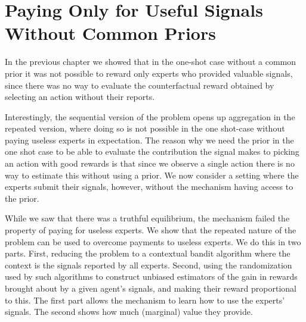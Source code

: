 




\section{Paying Only for Useful Signals Without Common Priors}

In the previous chapter we showed that in the one-shot case without a common prior it was not possible to reward only experts who provided valuable signals, since there was no way to evaluate the counterfactual reward obtained by selecting an action without their reports. 

Interestingly, the sequential version of the problem opens up aggregation in the repeated version, where doing so is not possible in the one shot-case without paying useless experts in expectation.
The reason why we need the prior in the one shot case to be able to evaluate the contribution the signal makes to picking an action with good rewards is that since we observe a single action there is no way to estimate this without using a prior. 
We now consider a setting where the experts submit their signals, however, without the mechanism having access to the prior.

While we saw that there was a truthful equilibrium, the mechanism failed the property of paying for useless experts. We show that the repeated nature of the problem can be used to overcome payments to useless experts. 
We do this in two parts. First, reducing the problem to a contextual bandit algorithm where the context is the signals reported by all experts. Second, using the randomization used by such algorithms to construct unbiased estimators of the gain in rewards brought about by a given agent's signals, and making their reward proportional to this.
The first part allows the mechanism to learn how to use the experts' signals. The second shows how much (marginal) value they provide.

